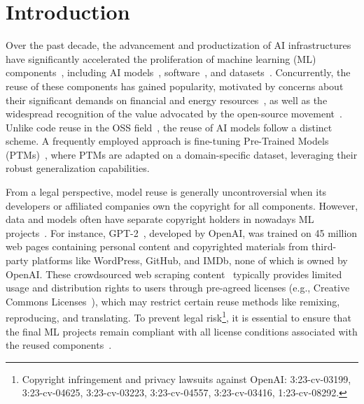 \section{Introduction}
Over the past decade, the advancement and productization of AI infrastructures have significantly accelerated the proliferation of machine learning (ML) components~\cite{jiang2023empirical}, including AI models~\cite{rombach2022high, touvron2023llama}, software~\cite{wolf2020transformers, he2022fastermoe}, and datasets~\cite{gao2020the, schuhmann2022laion}.
Concurrently, the reuse of these components has gained popularity, motivated by concerns about their significant demands on financial and energy resources~\cite{strubell2019energy}, as well as the widespread recognition of the value advocated by the open-source movement~\cite{rosen2005open}.
Unlike code reuse in the OSS field~\cite{perens1999open}, the reuse of AI models follow a distinct scheme.
A frequently employed approach is fine-tuning Pre-Trained Models (PTMs)~\cite{han2021pre, touvron2023llama}, where PTMs are adapted on a domain-specific dataset, leveraging their robust generalization capabilities. 

From a legal perspective, model reuse is generally uncontroversial when its developers or affiliated companies own the copyright for all components.
However, data and models often have separate copyright holders in nowadays ML projects~\cite{rajbahadur2021can, radford2019language, scao2022bloom, zeng2023glm}.
For instance, GPT-2~\cite{radford2019language}, developed by OpenAI, was trained on 45 million web pages containing personal content and copyrighted materials from third-party platforms like WordPress, GitHub, and IMDb, none of which is owned by OpenAI. %
These crowdsourced web scraping content~\cite{wang2023easyspider} typically provides limited usage and distribution rights to users through pre-agreed licenses (e.g., Creative Commons Licenses~\cite{creative2023list}), which may restrict certain reuse methods like remixing, reproducing, and translating. 
To prevent legal risk\footnote{Copyright infringement and privacy lawsuits against OpenAI: 3:23-cv-03199, 3:23-cv-04625, 3:23-cv-03223, 3:23-cv-04557, 3:23-cv-03416, 1:23-cv-08292.}, it is essential to ensure that the final ML projects remain compliant with all license conditions associated with the reused components~\cite{cui2023empirical, mathur2012empirical, kapitsaki2017automating}.

